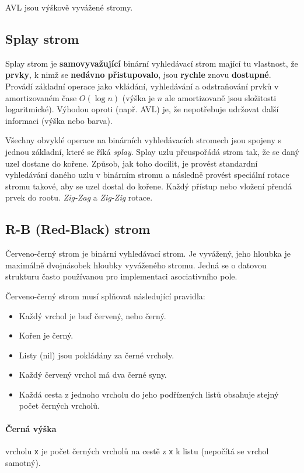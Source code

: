 AVL jsou výškově vyvážené stromy.

\subsection{Splay strom}
Splay strom je \textbf{samovyvažující} binární vyhledávací strom mající tu vlastnost, že \textbf{prvky}, k nimž se \textbf{nedávno přistupovalo}, jsou \textbf{rychle} znovu \textbf{dostupné}. Provádí základní operace jako vkládání, vyhledávání a odstraňování prvků v amortizovaném čase $O(\log n)$ (výška je $n$ ale amortizovaně jsou složitosti logaritmické). Výhodou oproti (např. AVL) je, že nepotřebuje udržovat další informaci (výška nebo barva).

Všechny obvyklé operace na binárních vyhledávacích stromech jsou spojeny s jednou základní, které se říká \textit{splay}. Splay uzlu přeuspořádá strom tak, že se daný uzel dostane do kořene. Způsob, jak toho docílit, je provést standardní vyhledávání daného uzlu v binárním stromu a následně provést speciální rotace stromu takové, aby se uzel dostal do kořene. Každý přístup nebo vložení přendá prvek do rootu. \textit{Zig-Zag} a \textit{Zig-Zig} rotace.

\subsection{R-B (Red-Black) strom}
Červeno-černý strom je binární vyhledávací strom. Je vyvážený, jeho hloubka je maximálně dvojnásobek hloubky vyváženého stromu. Jedná se o datovou strukturu často používanou pro implementaci asociativního pole.

Červeno-černý strom musí splňovat následující pravidla:
\begin{itemize}[itemsep=0px]
\item Každý vrchol je buď červený, nebo černý.
\item Kořen je černý.
\item Listy (nil) jsou pokládány za černé vrcholy.
\item Každý červený vrchol má dva černé syny.
\item Každá cesta z jednoho vrcholu do jeho podřízených listů obsahuje stejný počet černých vrcholů.
\end{itemize}

\paragraph{Černá výška} vrcholu \texttt{x} je počet černých vrcholů na cestě z \texttt{x} k listu (nepočítá se vrchol samotný).

